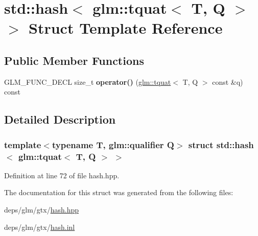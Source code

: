 \hypertarget{structstd_1_1hash_3_01glm_1_1tquat_3_01T_00_01Q_01_4_01_4}{}\section{std\+:\+:hash$<$ glm\+:\+:tquat$<$ T, Q $>$ $>$ Struct Template Reference}
\label{structstd_1_1hash_3_01glm_1_1tquat_3_01T_00_01Q_01_4_01_4}
\subsection*{Public Member Functions}
\begin{DoxyCompactItemize}
\item 
\mbox{\label{structstd_1_1hash_3_01glm_1_1tquat_3_01T_00_01Q_01_4_01_4_a1c9654ae9d55b9a6f49e11389464fd49}} 
G\+L\+M\+\_\+\+F\+U\+N\+C\+\_\+\+D\+E\+CL size\+\_\+t {\bfseries operator()} (\hyperlink{structglm_1_1tquat}{glm\+::tquat}$<$ T, Q $>$ const \&q) const
\end{DoxyCompactItemize}


\subsection{Detailed Description}
\subsubsection*{template$<$typename T, glm\+::qualifier Q$>$\newline
struct std\+::hash$<$ glm\+::tquat$<$ T, Q $>$ $>$}



Definition at line 72 of file hash.\+hpp.



The documentation for this struct was generated from the following files\+:\begin{DoxyCompactItemize}
\item 
deps/glm/gtx/\hyperlink{hash_8hpp}{hash.\+hpp}\item 
deps/glm/gtx/\hyperlink{hash_8inl}{hash.\+inl}\end{DoxyCompactItemize}
